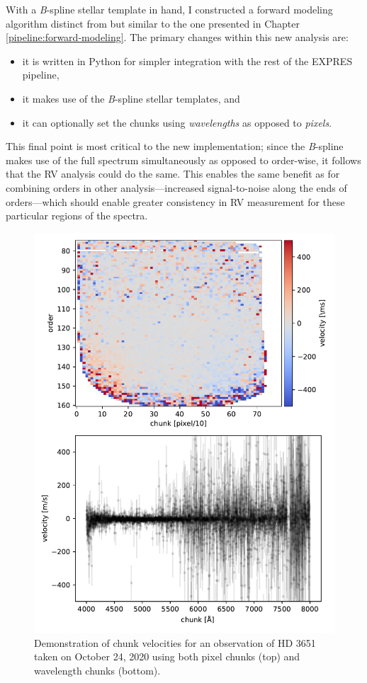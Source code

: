 With a \textit{B}-spline stellar template in hand, I constructed a forward modeling algorithm distinct from but similar to the one presented in Chapter \ref{pipeline:forward-modeling}. The primary changes within this new analysis are:
\begin{itemize}
    \item it is written in Python for simpler integration with the rest of the EXPRES pipeline,
    \item it makes use of the \textit{B}-spline stellar templates, and
    \item it can optionally set the chunks using \textit{wavelengths} as opposed to \textit{pixels}.
\end{itemize}
This final point is most critical to the new implementation; since the \textit{B}-spline makes use of the full spectrum simultaneously as opposed to order-wise, it follows that the RV analysis could do the same. This enables the same benefit as for combining orders in other analysis---increased signal-to-noise along the ends of orders---which should enable greater consistency in RV measurement for these particular regions of the spectra.

\begin{figure}
    \centering
    \includegraphics[width=\textwidth]{figures-5/chunk-vels.pdf}
    \caption[HD 3651 forward model chunk velocities]{Demonstration of chunk velocities for an observation of HD 3651 taken on October 24, 2020 using both pixel chunks (top) and wavelength chunks (bottom).}
    \label{fig:chunk-vels}
\end{figure}

